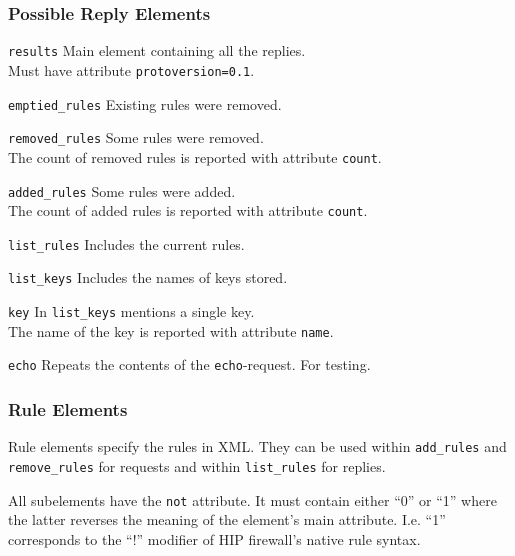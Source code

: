 \documentclass[a4paper,titlepage]{article}
\begin{document}
\subsubsection*{Possible Reply Elements}

\begin{description}
\item \texttt{results} Main element containing all the replies. \\
        Must have attribute \texttt{protoversion=0.1}.
\item \texttt{emptied\_rules} Existing rules were removed.
\item \texttt{removed\_rules} Some rules were removed. \\
        The count of removed rules is reported with attribute \texttt{count}.
\item \texttt{added\_rules} Some rules were added. \\
        The count of added rules is reported with attribute \texttt{count}.
\item \texttt{list\_rules} Includes the current rules.
\item \texttt{list\_keys} Includes the names of keys stored.
\item \texttt{key} In \texttt{list\_keys} mentions a single key. \\
        The name of the key is reported with attribute \texttt{name}.
\item \texttt{echo} Repeats the contents of the \texttt{echo}-request. For testing.
\end{description}

\subsubsection*{Rule Elements}

Rule elements specify the rules in XML. They can be used within
\texttt{add\_rules} and \texttt{remove\_rules} for requests and within
\texttt{list\_rules} for replies.

All subelements have the \texttt{not} attribute. It must contain
either ``0'' or ``1'' where the latter reverses the meaning of the
element's main attribute. I.e. ``1'' corresponds to the ``!'' modifier
of HIP firewall's native rule syntax.
\end{document}
